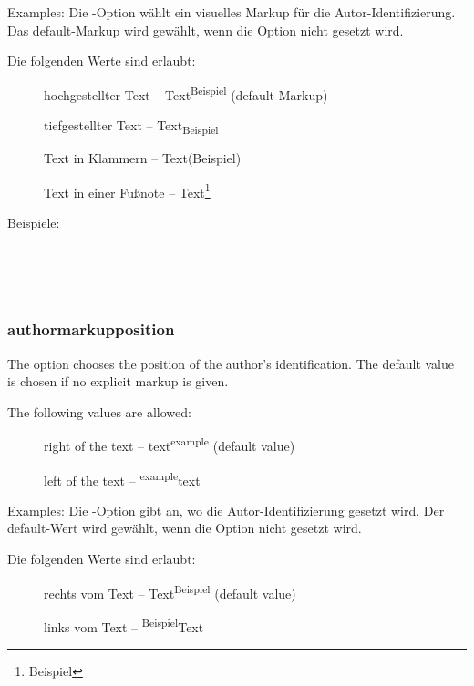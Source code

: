 Examples:
\fi
\ifGERMAN
	Die -Option wählt ein visuelles Markup für die Autor-Identifizierung.
	Das default-Markup wird gewählt, wenn die Option nicht gesetzt wird.

	Die folgenden Werte sind erlaubt:
	\begin{description}
		\item [] hochgestellter Text -- Text\textsuperscript{Beispiel} (default-Markup)
		\item [] tiefgestellter Text -- Text\textsubscript{Beispiel}
		\item [] Text in Klammern -- Text(Beispiel)
		\item [] Text in einer Fußnote -- Text\footnote{Beispiel}
	\end{description}

	Beispiele:
\fi

\\
\\
\\

\subsubsection{authormarkupposition}
\ifENGLISH
The  option chooses the position of the author's identification.
The default value is chosen if no explicit markup is given.

The following values are allowed:
\begin{description}
	\item [] right of the text -- text\textsuperscript{example} (default value)
	\item [] left of the text -- \textsuperscript{example}text
\end{description}

Examples:
\fi
\ifGERMAN
	Die -Option gibt an, wo die Autor-Identifizierung gesetzt wird.
	Der default-Wert wird gewählt, wenn die Option nicht gesetzt wird.

	Die folgenden Werte sind erlaubt:
	\begin{description}
		\item [] rechts vom Text -- Text\textsuperscript{Beispiel} (default value)
		\item [] links vom Text -- \textsuperscript{Beispiel}Text
	\end{description}

